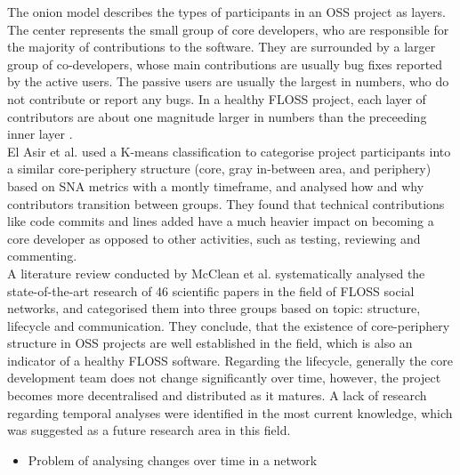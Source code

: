 The onion model describes the types of participants in an OSS project as layers. The center represents the small group of core developers, who are responsible for the majority of contributions to the software. They are surrounded by a larger group of co-developers, whose main contributions are usually bug fixes reported by the active users. The passive users are usually the largest in numbers, who do not contribute or report any bugs. In a healthy FLOSS project, each layer of contributors are about one magnitude larger in numbers than the preceeding inner layer \cite{mockusTwoCaseStudies2002}. \\

El Asir et al. \cite{elasriPeripheryCoreTemporal2017} used a K-means classification to categorise project participants into a similar core-periphery structure (core, gray in-between area, and periphery) based on SNA metrics with a montly timeframe, and analysed how and why contributors transition between groups. They found that technical contributions like code commits and lines added have a much heavier impact on becoming a core developer as opposed to other activities, such as testing, reviewing and commenting. \\

A literature review conducted by McClean et al. \cite{mccleanSocialNetworkAnalysis2021} systematically analysed the state-of-the-art research of 46 scientific papers in the field of FLOSS social networks, and categorised them into three groups based on topic: structure, lifecycle and communication. They conclude, that the existence of core-periphery structure in OSS projects are well established in the field, which is also an indicator of a healthy FLOSS software. Regarding the lifecycle, generally the core development team does not change significantly over time, however, the project becomes more decentralised and distributed as it matures. A lack of research regarding temporal analyses were identified in the most current knowledge, which was suggested as a future research area in this field. \\

\begin{itemize}
    \item Problem of analysing changes over time in a network
\end{itemize}


